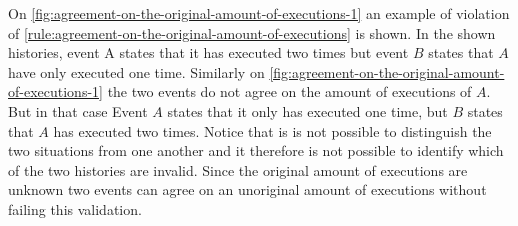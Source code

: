 	\newpar On \autoref{fig:agreement-on-the-original-amount-of-executions-1} an example of violation of \autoref{rule:agreement-on-the-original-amount-of-executions} is shown. In the shown histories, event A states that it has executed two times but event $B$ states that $A$ have only executed one time. Similarly on \autoref{fig:agreement-on-the-original-amount-of-executions-1} the two events do not agree on the amount of executions of $A$. But in that case Event $A$ states that it only has executed one time, but $B$ states that $A$ has executed two times. Notice that is is not possible to distinguish the two situations from one another and it therefore is not possible to identify which of the two histories are invalid. Since the original amount of executions are unknown two events can agree on an unoriginal amount of executions without failing this validation. 
	
